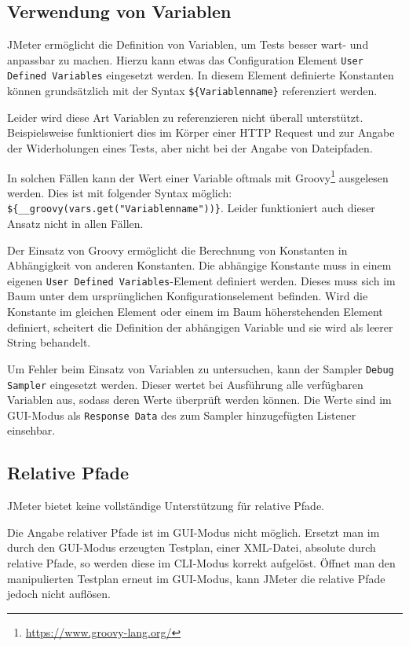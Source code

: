 \subsection{Verwendung von Variablen}

JMeter ermöglicht die Definition von Variablen, um Tests besser wart- und anpassbar zu machen.
Hierzu kann etwas das Configuration Element \texttt{User Defined Variables} eingesetzt werden.
In diesem Element definierte Konstanten können grundsätzlich mit der Syntax \texttt{\$\{Variablenname\}} referenziert werden.

Leider wird diese Art Variablen zu referenzieren nicht überall unterstützt.
Beispielsweise funktioniert dies im Körper einer HTTP Request und zur Angabe der Widerholungen eines Tests,
aber nicht bei der Angabe von Dateipfaden.

In solchen Fällen kann der Wert einer Variable oftmals mit Groovy\footnote{\url{https://www.groovy-lang.org/}} ausgelesen werden.
Dies ist mit folgender Syntax möglich: \texttt{\$\{\_\_groovy(vars.get("Variablenname"))\}}.
Leider funktioniert auch dieser Ansatz nicht in allen Fällen.

Der Einsatz von Groovy ermöglicht die Berechnung von Konstanten in Abhängigkeit von anderen Konstanten.
Die abhängige Konstante muss in einem eigenen \texttt{User Defined Variables}-Element definiert werden.
Dieses muss sich im Baum unter dem ursprünglichen Konfigurationselement befinden.
Wird die Konstante im gleichen Element oder einem im Baum höherstehenden Element definiert,
scheitert die Definition der abhängigen Variable und sie wird als leerer String behandelt.

Um Fehler beim Einsatz von Variablen zu untersuchen,
kann der Sampler \texttt{Debug Sampler} eingesetzt werden.
Dieser wertet bei Ausführung alle verfügbaren Variablen aus, sodass deren Werte überprüft werden können.
Die Werte sind im GUI-Modus als \texttt{Response Data} des zum Sampler hinzugefügten Listener einsehbar.

\subsection{Relative Pfade}

JMeter bietet keine vollständige Unterstützung für relative Pfade.

Die Angabe relativer Pfade ist im GUI-Modus nicht möglich.
Ersetzt man im durch den GUI-Modus erzeugten Testplan, einer XML-Datei, absolute durch relative Pfade,
so werden diese im CLI-Modus korrekt aufgelöst.
Öffnet man den manipulierten Testplan erneut im GUI-Modus,
kann JMeter die relative Pfade jedoch nicht auflösen.

